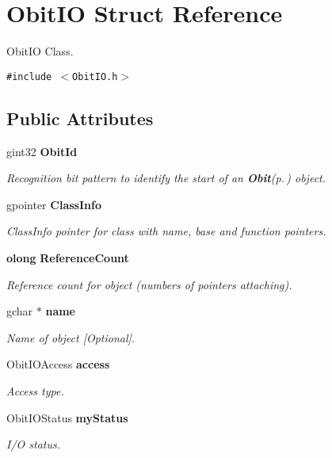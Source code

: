 \section{Obit\-IO Struct Reference}
\label{structObitIO}
Obit\-IO Class.  


{\tt \#include $<$Obit\-IO.h$>$}

\subsection*{Public Attributes}
\begin{CompactItemize}
\item 
gint32 {\bf Obit\-Id}
\begin{CompactList}\small\item\em Recognition bit pattern to identify the start of an {\bf Obit}{\rm (p.\,\pageref{structObit})} object. \item\end{CompactList}\item 
gpointer {\bf Class\-Info}
\begin{CompactList}\small\item\em Class\-Info pointer for class with name, base and function pointers. \item\end{CompactList}\item 
{\bf olong} {\bf Reference\-Count}
\begin{CompactList}\small\item\em Reference count for object (numbers of pointers attaching). \item\end{CompactList}\item 
gchar $\ast$ {\bf name}
\begin{CompactList}\small\item\em Name of object [Optional]. \item\end{CompactList}\item 
Obit\-IOAccess {\bf access}
\begin{CompactList}\small\item\em Access type. \item\end{CompactList}\item 
Obit\-IOStatus {\bf my\-Status}
\begin{CompactList}\small\item\em I/O status. \item\end{CompactList}\item 

\end{CompactItemize}
